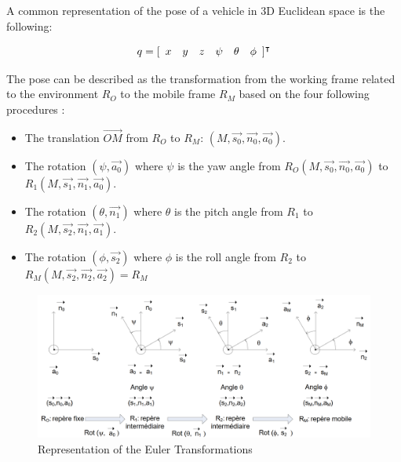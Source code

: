 \documentclass{thesisreport}
\begin{document}
A common representation of the pose of a vehicle in 3D Euclidean space is the following:



\begin{equation}
q=[\begin{array}{c c c c c c }
x & y & z & \psi & \theta & \phi
\end{array}]^{\intercal}
\end{equation}

The pose can be described as the transformation from the working frame related to the environment $R_O$ to the mobile frame $R_M$ based on the four following procedures \cite{Fantoni2016}:

\begin{itemize}
	\item The translation $\overrightarrow{OM}$ from $R_O$ to $R_M$: $(M,\overrightarrow{s_0}, \overrightarrow{n_0}, \overrightarrow{a_0} )$.
	\item The rotation $(\psi, \overrightarrow{a_0})$ where $\psi$ is the yaw angle from $R_O(M,\overrightarrow{s_0}, \overrightarrow{n_0}, \overrightarrow{a_0} )$ to $R_1(M,\overrightarrow{s_1}, \overrightarrow{n_1}, \overrightarrow{a_0} )$.
	\item The rotation $(\theta, \overrightarrow{n_1})$ where $\theta$ is the pitch angle from $R_1$ to $R_2 (M,\overrightarrow{s_2}, \overrightarrow{n_1}, \overrightarrow{a_1} )$.
	\item The rotation $(\phi, \overrightarrow{s_2})$ where $\phi$ is the roll angle from $R_2$ to $R_M (M,\overrightarrow{s_2}, \overrightarrow{n_2}, \overrightarrow{a_2} ) = R_M$ 
\end{itemize}

\begin{figure}[h]
\centering
\includegraphics[width=\textwidth]{Images/Modeling/Fantoni_d}
\caption{Representation of the Euler Transformations \cite{Fantoni2016} }
\label{Fantoni_d}
\end{figure}
\end{document}
